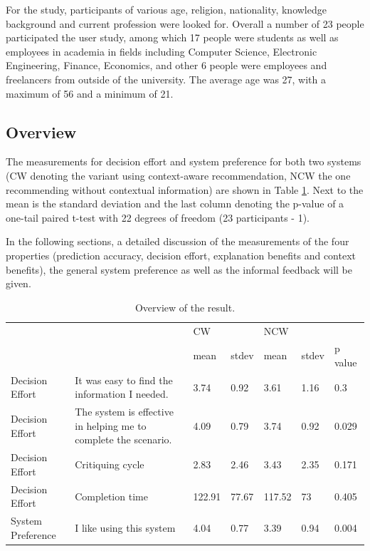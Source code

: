 For the study, participants of various age, religion, nationality, knowledge background and current profession were looked for. Overall a number of 23 people participated the user study, among which 17 people were students as well as employees in academia in fields including Computer Science, Electronic Engineering, Finance, Economics, and other 6 people were employees and freelancers from outside of the university. The average age was 27, with a maximum of 56 and a minimum of 21.

\subsection{Overview} \label{sec:results_o}

The measurements for decision effort and system preference for both two systems (CW denoting the variant using context-aware recommendation, NCW the one recommending without contextual information) are shown in Table \ref{tab:overview}. Next to the mean is the standard deviation and the last column denoting the p-value of a one-tail paired t-test with 22 degrees of freedom (23 participants - 1).

In the following sections, a detailed discussion of the measurements of the four properties (prediction accuracy, decision effort, explanation benefits and context benefits), the general system preference as well as the informal feedback will be given.

\begin{table}[H]
	\centering
	\caption{Overview of the result.}
	\label{tab:overview}
	\small
	\begin{tabular}{p{0.6in}p{1.2in}p{0.5in}p{0.5in}p{0.5in}p{0.5in}p{0.5in}}
	           \hline
		 &  & CW &  & NCW \\ 
 		 &  & mean & stdev & mean & stdev & p value \\ \hline
		 Decision Effort & It was easy to find the information I needed. & 3.74 & 0.92 & 3.61 & 1.16 & 0.3 \\ 
		Decision Effort & The system is effective in helping me to complete the scenario. & 4.09 & 0.79 & 3.74 & 0.92 & 0.029 \\ 
		Decision Effort & Critiquing cycle & 2.83 & 2.46 & 3.43 & 2.35 & 0.171 \\ 
		Decision Effort & Completion time & 122.91 & 77.67 & 117.52 & 73 & 0.405 \\  \hline
		System Preference & I like using this system & 4.04 & 0.77 & 3.39 & 0.94 & 0.004 \\ \hline
	\end{tabular}
\end{table}

